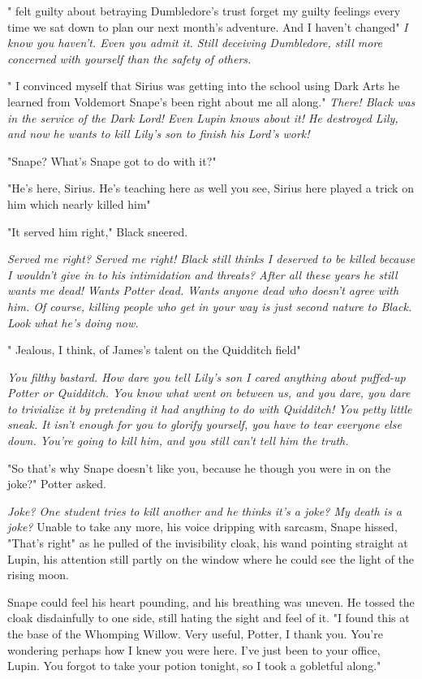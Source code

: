 "{\el} felt guilty about betraying Dumbledore's trust{\el} forget my guilty feelings every time we sat down to plan our next month's adventure. And I haven't changed{\el}" \emph{I know you haven't. Even you admit it. Still deceiving Dumbledore, still more concerned with yourself than the safety of others.}

"{\el} I convinced myself that Sirius was getting into the school using Dark Arts he learned from Voldemort{\el} Snape's been right about me all along." \emph{There! Black was in the service of the Dark Lord! Even Lupin knows about it! He destroyed Lily, and now he wants to kill Lily's son to finish his Lord's work!}

"Snape? What's Snape got to do with it?"

"He's here, Sirius. He's teaching here as well{\el} you see, Sirius here played a trick on him which nearly killed him{\el}"

"It served him right," Black sneered.

\emph{Served me right? Served me right! Black still thinks I deserved to be killed because I wouldn't give in to his intimidation and threats? After all these years he still wants me dead! Wants Potter dead. Wants anyone dead who doesn't agree with him. Of course, killing people who get in your way is just second nature to Black. Look what he's doing now.}

"{\el} Jealous, I think, of James's talent on the Quidditch field{\el}"

\emph{You filthy bastard. How dare you tell Lily's son I cared anything about puffed-up Potter or Quidditch. You know what went on between us, and you dare, you dare to trivialize it by pretending it had anything to do with Quidditch! You petty little sneak. It isn't enough for you to glorify yourself, you have to tear everyone else down. You're going to kill him, and you still can't tell him the truth.}

"So that's why Snape doesn't like you, because he though you were in on the joke?" Potter asked.

\emph{Joke? One student tries to kill another and he thinks it's a joke? My death is a joke?} Unable to take any more, his voice dripping with sarcasm, Snape hissed, "That's right" as he pulled of the invisibility cloak, his wand pointing straight at Lupin, his attention still partly on the window where he could see the light of the rising moon.

Snape could feel his heart pounding, and his breathing was uneven. He tossed the cloak disdainfully to one side, still hating the sight and feel of it. "I found this at the base of the Whomping Willow. Very useful, Potter, I thank you. You're wondering perhaps how I knew you were here. I've just been to your office, Lupin. You forgot to take your potion tonight, so I took a gobletful along."

